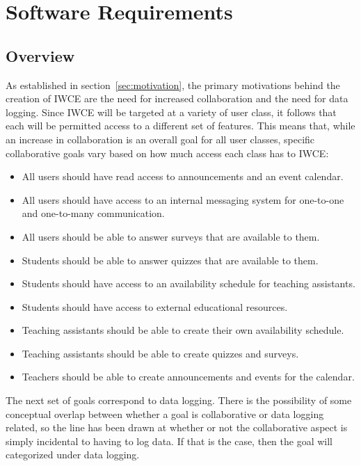 \chapter{Software Requirements}
\label{chap:software_requirements}

\section{Overview}

As established in section~\ref{sec:motivation}, the primary motivations behind the creation of IWCE  are the need for increased collaboration and the need for data logging. Since IWCE will be targeted at a variety of user class, it follows that each will be permitted access to a different set of features. This means that, while an increase in collaboration is an overall goal for all user classes, specific collaborative goals vary based on how much access each class has to IWCE:

\begin{itemize}
	\item All users should have read access to announcements and an event calendar.
	\item All users should have access to an internal messaging system for one-to-one and one-to-many communication.
	\item All users should be able to answer surveys that are available to them.
	\item Students should be able to answer quizzes that are available to them.
	\item Students should have access to an availability schedule for teaching assistants.
	\item Students should have access to external educational resources.
	\item Teaching assistants should be able to create their own availability schedule.
	\item Teaching assistants should be able to create quizzes and surveys.
	\item Teachers should be able to create announcements and events for the calendar.
\end{itemize}

The next set of goals correspond to data logging. There is the possibility of some conceptual overlap between whether a goal is collaborative or data logging related, so the line has been drawn at whether or not the collaborative aspect is simply incidental to having to log data. If that is the case, then the goal will categorized under data logging.

